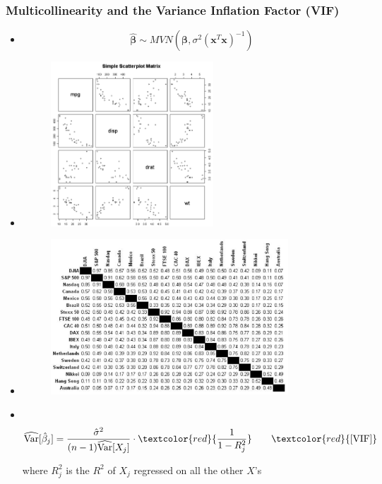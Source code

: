 \documentclass[xcolor={dvipsnames}]{beamer}
\begin{document}
\frame
{
 \frametitle{Multicollinearity and the Variance Inflation Factor (VIF)}


\begin{itemize}
\item[] 
$$\hat {\boldsymbol\beta} \sim MVN\left({\boldsymbol\beta},\sigma^2(\textbf{x}^T\textbf{x})^{-1}\right)$$
\item<2>[] 
\begin{figure}
\centering
\includegraphics[width=2.4in]{stuff/VIF2.png}
\end{figure}
\vspace{-2.5in}
\item<3>[] 
\begin{figure}
\centering
\includegraphics[width=3.5in]{stuff/VIF1.png}
\end{figure}
\vspace{-2.25in}
\item<4->[]${}$\\

 $$\widehat{\text{Var}}[\hat \beta_j] = \frac{\hat \sigma^2}{(n-1)  \widehat{\text{Var}}[X_j]}\cdot \textcolor{red}{\frac{1}{1-R^2_j}} \quad\quad \textcolor{red}{\text{[VIF]}}$$ 

where $R^2_j$ is the $R^2$ of $X_j$ regressed on all the other $X$'s\\${}$\\


\end{itemize}}
\end{document}
